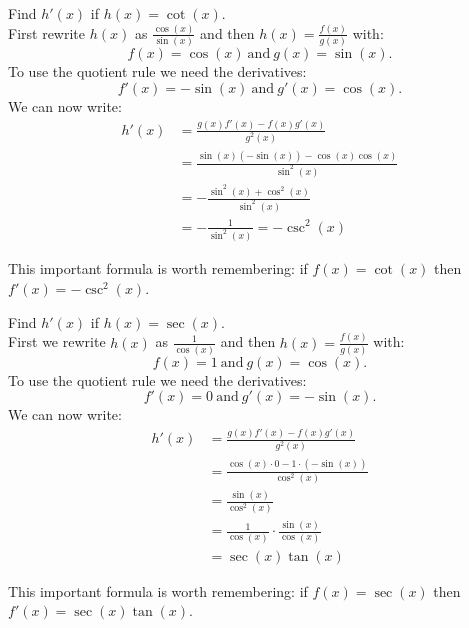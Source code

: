 \documentclass{ximera}
\begin{document}
\begin{center}
\begin{foldable}
\end{foldable}
\end{center}



\begin{example} %
Find $h'(x)$ if $h(x) = \cot(x)$.\\
First rewrite $h(x)$ as $\displaystyle{\frac{\cos(x)}{\sin(x)}}$ and then 
$\displaystyle{h(x) = \frac{f(x)}{g(x)}}$ with:
\[f(x) = \cos(x) \ \text{and} \  g(x)= \sin(x).\]
To use the quotient rule we need the derivatives:
\[f'(x) = -\sin(x) \ \text{and} \  g'(x) =\cos(x).\]
We can now write: 
\begin{align*}
h'(x) &= \frac{g(x)f'(x) - f(x)g'(x)}{g^2(x)}\\
&= \frac{\sin(x)(-\sin(x)) -\cos(x)\cos(x) }{\sin^2(x)}\\
&= -\frac{\sin^2(x)+ \cos^2(x)}{\sin^2(x)}\\
&= -\frac{1}{\sin^2(x)} = -\csc^2(x)
\end{align*}

This important formula is worth remembering: if $f(x) = \cot(x)$ then $f'(x) =-\csc^2(x)$.
\end{example}



\begin{center}
\begin{foldable}
\end{foldable}
\end{center}




\begin{example} %
Find $h'(x)$ if $h(x) = \sec(x).$\\
First we rewrite $h(x)$ as $\displaystyle{\frac{1}{\cos(x)}}$ 
and then $\displaystyle{h(x) = \frac{f(x)}{g(x)}}$ with:
\[f(x) = 1 \  \mbox{and} \  g(x)= \cos(x).\]
To use the quotient rule we need the derivatives:
\[f'(x) = 0 \  \mbox{and} \   g'(x) = -\sin(x).\]
We can now write: 
\begin{align*}
h'(x) &= \frac{g(x)f'(x) - f(x)g'(x)}{g^2(x)}\\
&= \frac{\cos(x)\cdot 0 - 1\cdot (-\sin(x))}{\cos^2(x)}\\
&= \frac{ \sin(x)}{\cos^2(x)} \\
&= \frac{ 1}{\cos(x)} \cdot \frac{\sin(x)}{\cos(x)}\\
&=  \sec(x) \tan(x)
\end{align*}

This important formula is worth remembering: if $f(x) = \sec(x)$ then $f'(x) =\sec(x) \tan(x)$.
\end{example}
\end{document}
